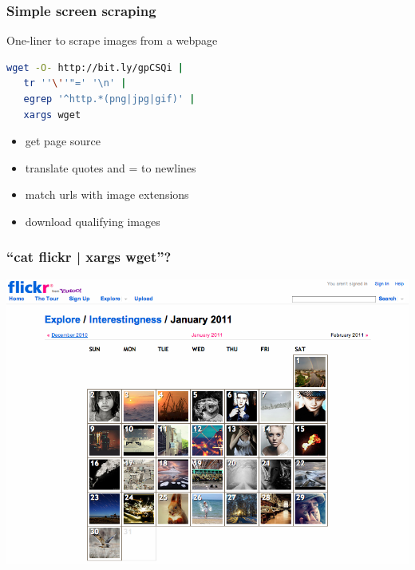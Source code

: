 \begin{frame}[fragile]
  \frametitle{Simple screen scraping}

    \begin{block}{One-liner to scrape images from a webpage}
        \begin{lstlisting}[language=bash]
 wget -O- http://bit.ly/gpCSQi | 
   tr ''\''"=' '\n' | 
   egrep '^http.*(png|jpg|gif)' | 
   xargs wget 
        \end{lstlisting}
    \end{block} 

    \pause
    \begin{itemize}
      \item get page source
      \item translate quotes and = to newlines
      \item match urls with image extensions
      \item download qualifying images
    \end{itemize}

\end{frame}


\begin{frame}
  \frametitle{``cat flickr \big| xargs wget''?}

  \begin{center}
    \includegraphics[width=\textwidth]{flickr_201101.png}
  \end{center}

\end{frame}



